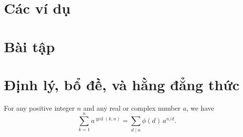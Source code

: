 \documentclass[../imo-training-open-book.tex]{subfiles}
\begin{document}
\newpage

\section{Các ví dụ}

 \newpage
 \newpage
 \newpage
 \newpage

\section{Bài tập}



\newpage

\section{Định lý, bổ đề, và hằng đẳng thức}

\begin{theorem*}
    \label{theorem:gcd-power-sum}
    For any positive integer \( n \) and any real or complex number \( a \), we have
    \[
        \sum_{k=1}^n a^{\gcd(k,n)} = \sum_{d \mid n} \phi(d) \, a^{n/d}.
    \]
\end{theorem*}
\end{document}

